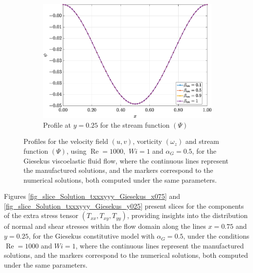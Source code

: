 \documentclass[preprint, 12pt]{elsarticle}
\begin{document}
\begin{figure}[H]
    \begin{subfigure}[b]{.46\textwidth}
        \includegraphics[width=\textwidth]{Slice_y_Tog_Numerical_NormErr_2nd_Betann_1_Re_1000_Wi_1_epsilon_0_xi_0_alphaG_0.5_Dt_1e-06_at_0.05_tipsim_1_MMS_12_x0.25y0.25_Psi.eps}
        \caption{Profile at $y=0.25$ for the stream function $(\Psi)$}
        \label{fig_slice_y_psi_2nd_Case1_giesekus_y025}
    \end{subfigure}
    \vspace{0.02cm}
    \caption{Profiles for the velocity field $(u,v)$, vorticity $(\omega_{z})$ and stream function $(\Psi)$, using $\operatorname{Re}=1000,$ $Wi=1$ and $\alpha_{G} = 0.5$, for the Giesekus viscoelastic fluid flow, where the continuous lines represent the manufactured solutions, and the markers correspond to the numerical solutions, both computed under the same parameters.\label{fig_slice_Solution_uvwzpsi_Giesekus_x025}}
\end{figure}

Figures \ref{fig_slice_Solution_txxxyyy_Giesekus_x075} and
\ref{fig_slice_Solution_txxxyyy_Giesekus_y025} present slices for the
components of the extra stress tensor $(T_{xx}, T_{xy}, T_{yy})$, providing
insights into the distribution of normal and shear stresses within the flow
domain along the lines $x=0.75$ and $y=0.25$, for the Giesekus constitutive
model with $\alpha_G = 0.5$, under the conditions $\operatorname{Re}=1000$ and
$Wi=1$, where the continuous lines represent the manufactured solutions, and
the markers correspond to the numerical solutions, both computed under the same
parameters.
\end{document}
